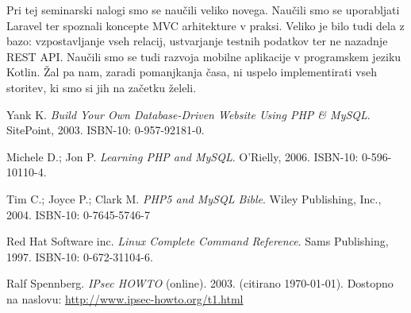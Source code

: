 \documentclass[a4paper,12pt]{report}
\begin{document}
Pri tej seminarski nalogi smo se naučili veliko novega. Naučili smo se uporabljati Laravel ter spoznali koncepte MVC arhitekture v praksi. Veliko je bilo tudi dela z bazo: vzpostavljanje vseh relacij, ustvarjanje testnih podatkov ter ne nazadnje REST API. Naučili smo se tudi razvoja mobilne aplikacije v programskem jeziku Kotlin. Žal pa nam, zaradi pomanjkanja časa, ni uspelo implementirati vseh storitev, ki smo si jih na začetku želeli.

\begin{thebibliography}{99}
\addtocounter{chapter}{1}

 Yank K. \emph{Build Your Own Database-Driven Website Using PHP \& MySQL}. SitePoint, 2003. ISBN-10: 0-957-92181-0.

 Michele D.; Jon P. \emph{Learning PHP and MySQL}. O'Rielly, 2006. ISBN-10: 0-596-10110-4.

 Tim C.; Joyce P.; Clark M. \emph{PHP5 and MySQL Bible}. Wiley Publishing, Inc., 2004. ISBN-10: 0-7645-5746-7

 Red Hat Software inc. \emph{Linux Complete Command Reference}. Sams Publishing, 1997. ISBN-10: 0-672-31104-6.

 Ralf Spennberg. \emph{IPsec HOWTO} (online). 2003. (citirano \today). Dostopno na naslovu:
\url{http://www.ipsec-howto.org/t1.html}

\end{thebibliography}
\end{document}

